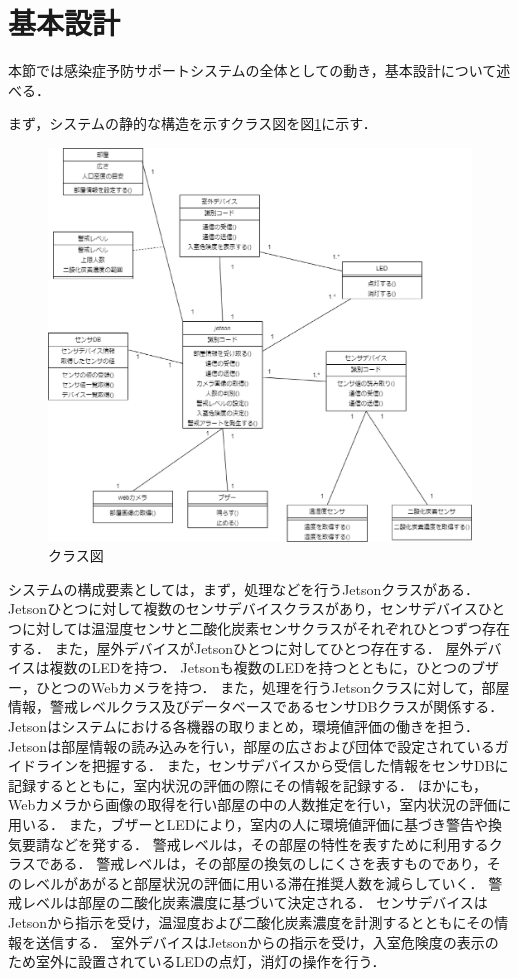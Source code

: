 


\section{基本設計}

本節では感染症予防サポートシステムの全体としての動き，基本設計について述べる．

まず，システムの静的な構造を示すクラス図を図\ref{class}に示す．
\begin{figure}[htbp]
    \centering
    \includegraphics[width = 15cm]{./picture/class_3.eps}
    \caption{クラス図}
    \label{class}
\end{figure}
システムの構成要素としては，まず，処理などを行うJetsonクラスがある．
Jetsonひとつに対して複数のセンサデバイスクラスがあり，センサデバイスひとつに対しては温湿度センサと二酸化炭素センサクラスがそれぞれひとつずつ存在する．
また，屋外デバイスがJetsonひとつに対してひとつ存在する．
屋外デバイスは複数のLEDを持つ．
Jetsonも複数のLEDを持つとともに，ひとつのブザー，ひとつのWebカメラを持つ．
また，処理を行うJetsonクラスに対して，部屋情報，警戒レベルクラス及びデータベースであるセンサDBクラスが関係する．
Jetsonはシステムにおける各機器の取りまとめ，環境値評価の働きを担う．
Jetsonは部屋情報の読み込みを行い，部屋の広さおよび団体で設定されているガイドラインを把握する．
また，センサデバイスから受信した情報をセンサDBに記録するとともに，室内状況の評価の際にその情報を記録する．
ほかにも，Webカメラから画像の取得を行い部屋の中の人数推定を行い，室内状況の評価に用いる．
また，ブザーとLEDにより，室内の人に環境値評価に基づき警告や換気要請などを発する．
警戒レベルは，その部屋の特性を表すために利用するクラスである．
警戒レベルは，その部屋の換気のしにくさを表すものであり，そのレベルがあがると部屋状況の評価に用いる滞在推奨人数を減らしていく．
警戒レベルは部屋の二酸化炭素濃度に基づいて決定される．
センサデバイスはJetsonから指示を受け，温湿度および二酸化炭素濃度を計測するとともにその情報を送信する．
室外デバイスはJetsonからの指示を受け，入室危険度の表示のため室外に設置されているLEDの点灯，消灯の操作を行う．


